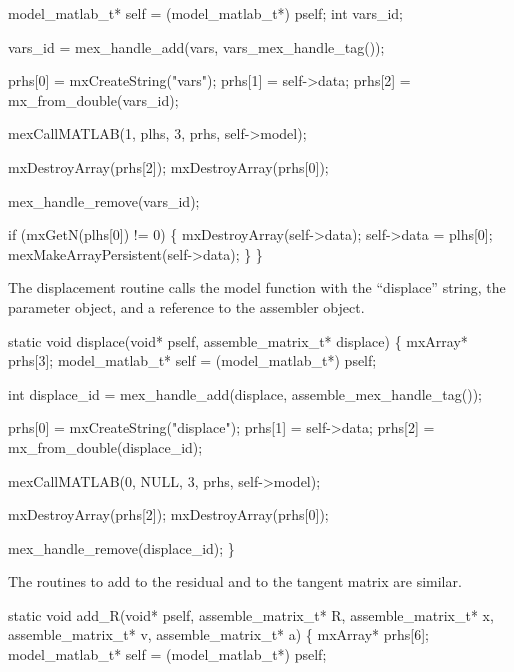     model_matlab_t* self = (model_matlab_t*) pself;
    int vars_id;

    vars_id = mex_handle_add(vars, vars_mex_handle_tag());

    prhs[0] = mxCreateString("vars");
    prhs[1] = self->data;
    prhs[2] = mx_from_double(vars_id);

    mexCallMATLAB(1, plhs, 3, prhs, self->model); 

    mxDestroyArray(prhs[2]);
    mxDestroyArray(prhs[0]);

    mex_handle_remove(vars_id);

    if (mxGetN(plhs[0]) != 0) \{
        mxDestroyArray(self->data);
        self->data = plhs[0];
        mexMakeArrayPersistent(self->data);
    \}
\}

\nwendcode{}\nwdocspar

The displacement routine calls the model function with
the ``displace'' string, the parameter object, and a reference
to the assembler object.  

\nwenddocs{}\plusendmoddef
static void displace(void* pself, assemble_matrix_t* displace)
\{
    mxArray* prhs[3];
    model_matlab_t* self = (model_matlab_t*) pself;

    int displace_id = mex_handle_add(displace, assemble_mex_handle_tag());

    prhs[0] = mxCreateString("displace");
    prhs[1] = self->data;
    prhs[2] = mx_from_double(displace_id);

    mexCallMATLAB(0, NULL, 3, prhs, self->model); 

    mxDestroyArray(prhs[2]);
    mxDestroyArray(prhs[0]);

    mex_handle_remove(displace_id);
\}

\nwendcode{}\nwdocspar

The routines to add to the residual and to the tangent matrix are similar.

\nwenddocs{}\plusendmoddef
static void add_R(void* pself, assemble_matrix_t* R, 
                  assemble_matrix_t* x,
                  assemble_matrix_t* v,
                  assemble_matrix_t* a)
\{
    mxArray* prhs[6];
    model_matlab_t* self = (model_matlab_t*) pself;

